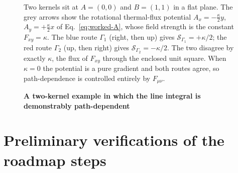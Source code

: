 \documentclass[%
 reprint, amsmath,amssymb, aps, prb, ]{revtex4-2}
\numberwithin{equation}{section}
\begin{document}
\begin{figure}[t!]
\centering
{}
\caption{\textbf{A two-kernel example in which the line integral is demonstrably path-dependent}}
\label{fig:worked}
\vspace{0.4em}
\begin{minipage}{0.95\textwidth}
\justifying\small
Two kernels sit at $A=(0,0)$ and $B=(1,1)$ in a flat plane. The grey arrows show the rotational thermal-flux potential $A_x=-\tfrac{\kappa}{2}y$, $A_y=+\tfrac{\kappa}{2}x$ of Eq.~\eqref{eq:worked-A}, whose field strength is the constant $F_{xy}=\kappa$. The blue route $\Gamma_1$ (right, then up) gives $\mathcal{S}_{\Gamma_1}=+\kappa/2$; the red route $\Gamma_2$ (up, then right) gives $\mathcal{S}_{\Gamma_2}=-\kappa/2$. The two disagree by exactly $\kappa$, the flux of $F_{xy}$ through the enclosed unit square. When $\kappa=0$ the potential is a pure gradient and both routes agree, so path-dependence is controlled entirely by $F_{\mu\nu}$.
\end{minipage}
\end{figure}

\section{Preliminary verifications of the roadmap steps}
\label{app:checks}
\end{document}
